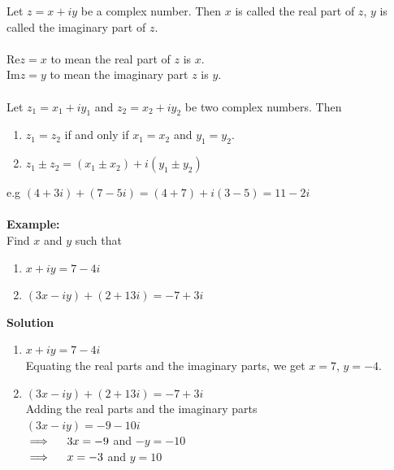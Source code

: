\documentclass[11pt,a4paper]{article}
\begin{document}
\begin{figure}[H]
\centering
{}
\end{figure}





Let $z=x+iy$ be a complex number. Then $x$ is called the real part of $z$, $y$ is called the imaginary part of $z$.\\\\
Re$z=x$ to mean the real part of $z$ is $x$.\\

Im$z=y$  to mean the imaginary part $z$ is $y$.\\\\

Let $z_1=x_1+iy_1$ and $z_2=x_2+iy_2$ be two complex numbers. Then
\begin{enumerate}
\item $z_1=z_2$ if and only if $x_1=x_2$ and $y_1=y_2$.

\item $z_1\pm z_2 = (x_1\pm x_2)+i(y_1\pm y_2)$\\
\end{enumerate}

e.g $(4+3i)+(7-5i)=(4+7)+i(3-5)=11-2i$\\\\

\textbf{Example:}\\
Find $x$ and $y$ such that
\begin{enumerate}
\item $x+iy=7-4i$

\item $(3x-iy)+(2+13i)=-7+3i$\\
\end{enumerate}

\textbf{Solution}
\begin{enumerate}
\item $x+iy=7-4i$ \\
Equating the real parts and the imaginary parts, we get $x=7$, $y=-4$.

\item $(3x-iy)+(2+13i) =-7+3i$\\
Adding the real parts and the imaginary parts\\
$(3x-iy)=-9-10i$\\
$\implies \hspace{0.4cm} 3x=-9$ and $-y=-10$\\
$\implies \hspace{0.4cm} x=-3$ and $y=10$\\
\end{enumerate}
\end{document}
